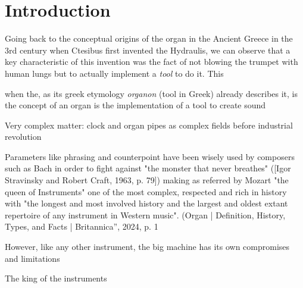 \chapter{Introduction}

Going back to the conceptual origins of the organ in the Ancient Greece in the 3rd century when Ctesibus first invented the Hydraulis, we can observe that a key characteristic of this invention was the fact of not blowing the trumpet with human lungs but to actually implement a \textit{tool} to do it. This



  when the, as its greek etymology \textit{organon} (tool in Greek) already describes it, is the concept of an organ is the implementation of a tool to create sound 

Very complex matter: clock and organ pipes as complex fields before industrial revolution 



Parameters like phrasing and counterpoint have been wisely used by composers such as Bach in order to fight against "the monster that never breathes" ([Igor Stravinsky and Robert Craft, 1963, p. 79]) making as referred by Mozart "the queen of Instruments" one of the most complex, respected and rich in history with "the longest and most involved history and the largest and oldest extant repertoire of any instrument in Western music". (Organ | Definition, History, Types, and Facts | Britannica”, 2024, p. 1


However, like any other instrument, the big machine has its own compromises and limitations

The king of the instruments 